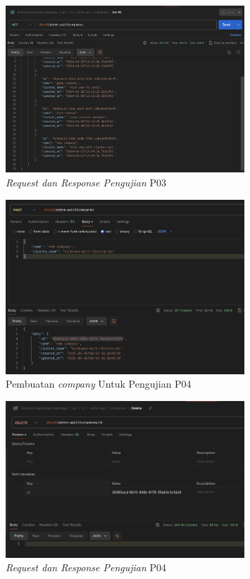 \begin{figure}[ht]
  \centering
  \includegraphics[width=0.8\textwidth]{resources/chapter-4/pengujian/p03.jpg}
  \caption{\textit{Request dan Response Pengujian} P03}
  \label{fig:pengujian-p03}
\end{figure}

\begin{figure}[ht]
  \centering
  \includegraphics[width=0.8\textwidth]{resources/chapter-4/pengujian/p04-1.jpg}
  \caption{Pembuatan \textit{company} Untuk Pengujian P04}
  \label{fig:pengujian-p04-1}
\end{figure}

\begin{figure}[ht]
  \centering
  \includegraphics[width=0.8\textwidth]{resources/chapter-4/pengujian/p04.jpg}
  \caption{\textit{Request dan Response Pengujian} P04}
  \label{fig:pengujian-p04}
\end{figure}

